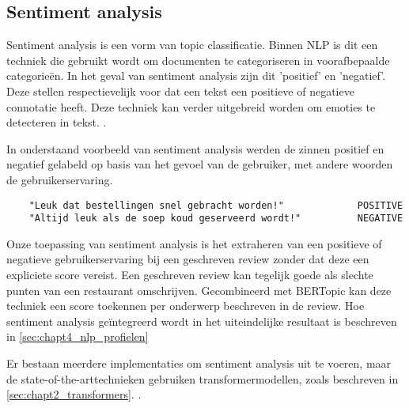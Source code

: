 \subsection{Sentiment analysis}
Sentiment analysis is een vorm van topic classificatie. Binnen NLP is dit een techniek die gebruikt wordt om documenten te categoriseren in voorafbepaalde categorieën. In het geval van sentiment analysis zijn dit 'positief' en 'negatief'. Deze stellen respectievelijk voor dat een tekst een positieve of negatieve connotatie heeft. Deze techniek kan verder uitgebreid worden om emoties te detecteren in tekst. \cite{paper_emotions}.

In onderstaand voorbeeld van sentiment analysis werden de zinnen positief en negatief gelabeld op basis van het gevoel van de gebruiker, met andere woorden de gebruikerservaring.

\begin{Verbatim}
    "Leuk dat bestellingen snel gebracht worden!"             POSITIVE
    "Altijd leuk als de soep koud geserveerd wordt!"          NEGATIVE
\end{Verbatim}

Onze toepassing van sentiment analysis is het extraheren van een positieve of negatieve gebruikerservaring bij een geschreven review zonder dat deze een expliciete score vereist. Een geschreven review kan tegelijk goede als slechte punten van een restaurant omschrijven. Gecombineerd met BERTopic kan deze techniek een score toekennen per onderwerp beschreven in de review. Hoe sentiment analysis geïntegreerd wordt in het uiteindelijke resultaat is beschreven in \autoref{sec:chapt4_nlp_profielen}

Er bestaan meerdere implementaties om sentiment analysis uit te voeren, maar de state-of-the-arttechnieken gebruiken transformermodellen, zoals beschreven in \autoref{sec:chapt2_transformers}. \cite{sentiment_older_paper, sentiment_transformer_paper}.
